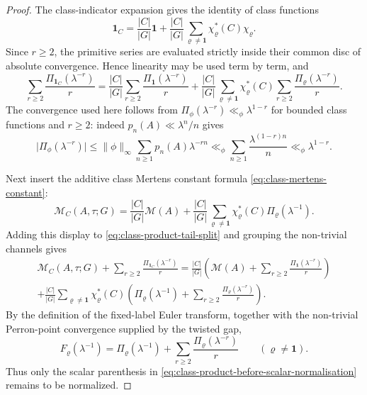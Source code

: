 \documentclass[11pt,a4paper]{amsart}
\theoremstyle{plain}
\theoremstyle{definition}
\theoremstyle{remark}
\newcommand{\abs}[1]{\lvert #1 \rvert}
\newcommand{\norm}[1]{\lVert #1 \rVert}
\begin{document}
\begin{proof}
  The class-indicator expansion gives the identity of class functions
  \[
    \mathbf1_C
    =
    \frac{|C|}{|G|}\mathbf1
    +
    \frac{|C|}{|G|}
      \sum_{\varrho\neq\mathbf1}\chi_\varrho^\ast(C)\chi_\varrho .
  \]
  Since \(r\ge2\), the primitive series are evaluated strictly inside
  their common disc of absolute convergence. Hence linearity may be used
  term by term, and
  \begin{equation}\label{eq:class-product-tail-split}
    \sum_{r\ge2}\frac{\Pi_{\mathbf1_C}(\lambda^{-r})}{r}
    =
    \frac{|C|}{|G|}\sum_{r\ge2}\frac{\Pi_{\mathbf1}(\lambda^{-r})}{r}
    +
    \frac{|C|}{|G|}
      \sum_{\varrho\neq\mathbf1}\chi_\varrho^\ast(C)
      \sum_{r\ge2}\frac{\Pi_\varrho(\lambda^{-r})}{r}.
  \end{equation}
  The convergence used here follows from
  \(\Pi_\phi(\lambda^{-r})\ll_\phi\lambda^{1-r}\) for bounded class
  functions and \(r\ge2\): indeed \(p_n(A)\ll\lambda^n/n\) gives
  \[
    \abs{\Pi_\phi(\lambda^{-r})}
    \le
    \norm{\phi}_\infty\sum_{n\ge1}p_n(A)\lambda^{-rn}
    \ll_\phi
    \sum_{n\ge1}\frac{\lambda^{(1-r)n}}{n}
    \ll_\phi \lambda^{1-r}.
  \]

  Next insert the additive class Mertens constant formula
  \eqref{eq:class-mertens-constant}:
  \[
    \mathcal M_C(A,\tau;G)
    =
    \frac{|C|}{|G|}\mathcal M(A)
    +
    \frac{|C|}{|G|}
      \sum_{\varrho\neq\mathbf1}
        \chi_\varrho^\ast(C)\Pi_\varrho(\lambda^{-1}).
  \]
  Adding this display to \eqref{eq:class-product-tail-split} and
  grouping the non-trivial channels gives
  \begin{multline}\label{eq:class-product-before-scalar-normalisation}
    \mathcal M_C(A,\tau;G)
    +\sum_{r\ge2}\frac{\Pi_{\mathbf1_C}(\lambda^{-r})}{r}
    =
    \frac{|C|}{|G|}
    \left(
      \mathcal M(A)+\sum_{r\ge2}\frac{\Pi_{\mathbf1}(\lambda^{-r})}{r}
    \right) \\
    +
    \frac{|C|}{|G|}
      \sum_{\varrho\neq\mathbf1}\chi_\varrho^\ast(C)
      \left(
        \Pi_\varrho(\lambda^{-1})
        +\sum_{r\ge2}\frac{\Pi_\varrho(\lambda^{-r})}{r}
      \right).
  \end{multline}
  By the definition of the fixed-label Euler transform, together with the
  non-trivial Perron-point convergence supplied by the twisted gap,
  \[
    F_\varrho(\lambda^{-1})
    =
    \Pi_\varrho(\lambda^{-1})
    +\sum_{r\ge2}\frac{\Pi_\varrho(\lambda^{-r})}{r}
    \qquad(\varrho\neq\mathbf1).
  \]
  Thus only the scalar parenthesis in
  \eqref{eq:class-product-before-scalar-normalisation} remains to be
  normalized.


\end{proof}
\end{document}
